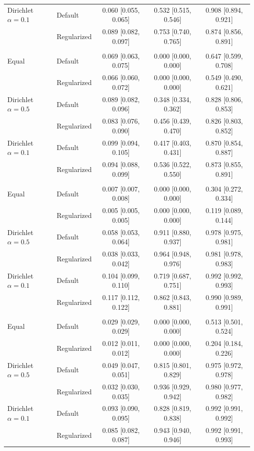 \begin{tabular}{llccc}
Dirichlet $\alpha=0.1$ & Default & 0.060 [0.055, 0.065] & 0.532 [0.515, 0.546] & 0.908 [0.894, 0.921] \\
 & Regularized & 0.089 [0.082, 0.097] & 0.753 [0.740, 0.765] & 0.874 [0.856, 0.891] \\
\addlinespace
\multicolumn{5}{@{}l}{\textit{Diabetic, XGBoost}} \\
Equal & Default & 0.069 [0.063, 0.075] & 0.000 [0.000, 0.000] & 0.647 [0.599, 0.708] \\
 & Regularized & 0.066 [0.060, 0.072] & 0.000 [0.000, 0.000] & 0.549 [0.490, 0.621] \\
Dirichlet $\alpha=0.5$ & Default & 0.089 [0.082, 0.096] & 0.348 [0.334, 0.362] & 0.828 [0.806, 0.853] \\
 & Regularized & 0.083 [0.076, 0.090] & 0.456 [0.439, 0.470] & 0.826 [0.803, 0.852] \\
Dirichlet $\alpha=0.1$ & Default & 0.099 [0.094, 0.105] & 0.417 [0.403, 0.431] & 0.870 [0.854, 0.887] \\
 & Regularized & 0.094 [0.088, 0.099] & 0.536 [0.522, 0.550] & 0.873 [0.855, 0.891] \\
\addlinespace
\multicolumn{5}{@{}l}{\textit{Heart, Random Forest}} \\
Equal & Default & 0.007 [0.007, 0.008] & 0.000 [0.000, 0.000] & 0.304 [0.272, 0.334] \\
 & Regularized & 0.005 [0.005, 0.005] & 0.000 [0.000, 0.000] & 0.119 [0.089, 0.144] \\
Dirichlet $\alpha=0.5$ & Default & 0.058 [0.053, 0.064] & 0.911 [0.880, 0.937] & 0.978 [0.975, 0.981] \\
 & Regularized & 0.038 [0.033, 0.042] & 0.964 [0.948, 0.976] & 0.981 [0.978, 0.983] \\
Dirichlet $\alpha=0.1$ & Default & 0.104 [0.099, 0.110] & 0.719 [0.687, 0.751] & 0.992 [0.992, 0.993] \\
 & Regularized & 0.117 [0.112, 0.122] & 0.862 [0.843, 0.881] & 0.990 [0.989, 0.991] \\
\addlinespace
\multicolumn{5}{@{}l}{\textit{Heart, XGBoost}} \\
Equal & Default & 0.029 [0.029, 0.029] & 0.000 [0.000, 0.000] & 0.513 [0.501, 0.524] \\
 & Regularized & 0.012 [0.011, 0.012] & 0.000 [0.000, 0.000] & 0.204 [0.184, 0.226] \\
Dirichlet $\alpha=0.5$ & Default & 0.049 [0.047, 0.051] & 0.815 [0.801, 0.829] & 0.975 [0.972, 0.978] \\
 & Regularized & 0.032 [0.030, 0.035] & 0.936 [0.929, 0.942] & 0.980 [0.977, 0.982] \\
Dirichlet $\alpha=0.1$ & Default & 0.093 [0.090, 0.095] & 0.828 [0.819, 0.838] & 0.992 [0.991, 0.992] \\
 & Regularized & 0.085 [0.082, 0.087] & 0.943 [0.940, 0.946] & 0.992 [0.991, 0.993] \\
\bottomrule
\end{tabular}
